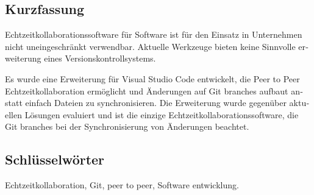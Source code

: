 
\cleardoublepage
{}




\begin{otherlanguage}{ngerman}

  \chapter*{Kurzfassung}

  Echtzeitkollaborationssoftware für Software ist für den Einsatz in Unternehmen nicht uneingeschränkt verwendbar. Aktuelle Werkzeuge bieten keine Sinnvolle erweiterung eines Versionskontrollsystems.
  
  Es wurde eine Erweiterung für Visual Studio Code entwickelt, die Peer to Peer Echtzeitkollaboration ermöglicht und Änderungen auf Git branches aufbaut anstatt einfach Dateien zu synchronisieren. Die Erweiterung wurde gegenüber aktuellen Lösungen evaluiert und ist die einzige Echtzeitkollaborationssoftware, die Git branches bei der Synchronisierung von Änderungen beachtet.

	

  \bigskip

  \section*{Schl\"usselw\"orter}
  Echtzeitkollaboration, Git, peer to peer,  Software entwicklung.

\end{otherlanguage}


